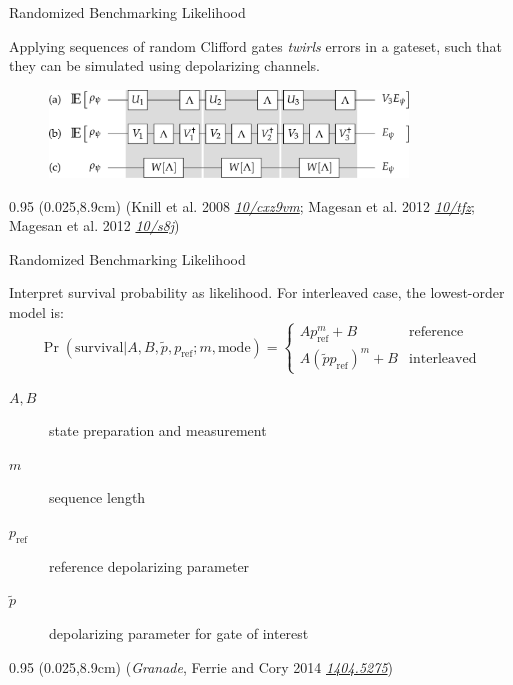 \documentclass[xcolor=dvipsnames, compress]{beamer}
\renewcommand\UrlFont{\color{red}\rmfamily\itshape}
\newcommand{\shortdoi}[1]{\href{http://doi.org/#1}{\UrlFont 10/#1}}
\newcommand{\arxiv}[1]{\href{https://scirate.com/arxiv/#1}{\UrlFont #1}}
\newcommand{\bottomnote}[1]{
  \begin{textblock*}{0.95\paperwidth} (0.025\paperwidth,8.9cm)
    {\tiny \hfill #1}
  \end{textblock*}
}
\begin{document}
\begin{frame}{Randomized Benchmarking Likelihood}

  Applying sequences of random Clifford gates \emph{twirls}
  errors in a gateset, such that they can be simulated
  using depolarizing channels.

  \begin{figure}
    \centering
    \includegraphics[width=0.85\textwidth]{figures/rb-0order-deriv}
  \end{figure}

  \bottomnote{(Knill et al. 2008 \shortdoi{cxz9vm}; Magesan et al. 2012 \shortdoi{tfz}; Magesan et al. 2012 \shortdoi{s8j})}

\end{frame}

\begin{frame}{Randomized Benchmarking Likelihood}

  Interpret survival probability as likelihood.
  For interleaved case, the lowest-order model is:
  \[
    \Pr(\text{survival} | A, B, \tilde{p}, p_{\text{ref}}; m, \text{mode}) =
    \begin{cases}
      A p_{\text{ref}}^m + B & \text{reference} \\
      A (\tilde{p} p_{\text{ref}})^m + B & \text{interleaved}
    \end{cases}
  \]

  \begin{description}
    \item[$A,B$] state preparation and measurement
    \item[$m$] sequence length
    \item[$p_{\text{ref}}$] reference depolarizing parameter
    \item[$\tilde{p}$] depolarizing parameter for gate of interest
  \end{description}


  \bottomnote{(\emph{Granade}, Ferrie and Cory 2014 \arxiv{1404.5275})}

\end{frame}
\end{document}

